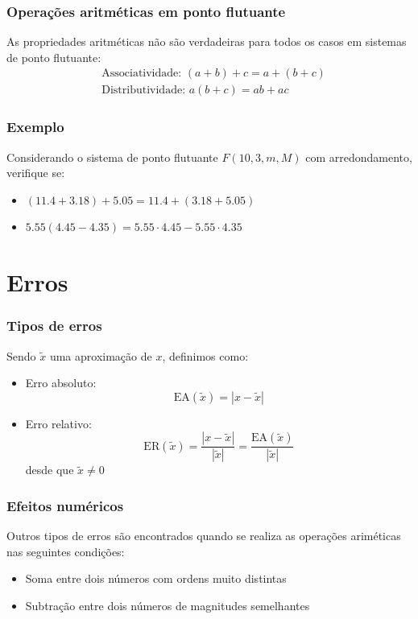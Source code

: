 \documentclass{beamer}
\begin{document}
\begin{frame}
	\frametitle{Operações aritméticas em ponto flutuante}
	As propriedades aritméticas não são verdadeiras para todos os casos em sistemas de ponto flutuante:
	\begin{equation*}
		\begin{aligned}
			&\mbox{Associatividade: } (a + b) + c = a + (b + c)\\
			&\mbox{Distributividade: } a (b + c) = ab + ac		
		\end{aligned}
	\end{equation*}
\end{frame}

\begin{frame}
	\frametitle{Exemplo}
	Considerando o sistema de ponto flutuante $ F(10, 3, m, M) $ com arredondamento, verifique se:
	\begin{itemize}
		\item $ (11.4 + 3.18) + 5.05 = 11.4 + (3.18 + 5.05) $
		\item $ 5.55(4.45 - 4.35) = 5.55\cdot 4.45 - 5.55\cdot4.35$
	\end{itemize}
\end{frame}

\section{Erros}

\begin{frame}
	\frametitle{Tipos de erros}
	Sendo $ \tilde{x} $ uma aproximação de $ x $, definimos como:
	\begin{itemize}
		\item Erro absoluto:
		\begin{equation*}
			\mbox{EA}(\tilde{x}) = |x - \tilde{x}|
		\end{equation*}
		\item Erro relativo:
		\begin{equation*}
			\mbox{ER}(\tilde{x}) = \frac{|x - \tilde{x}|}{|\tilde{x}|} = \frac{\mbox{EA}(\tilde{x})}{|\tilde{x}|}
		\end{equation*}
		desde que $ \tilde{x} \neq 0 $
	\end{itemize}
\end{frame}

\begin{frame}
	\frametitle{Efeitos numéricos}
	Outros tipos de erros são encontrados quando se realiza as operações ariméticas nas seguintes condições:
	\begin{itemize}
	\item Soma entre dois números com ordens muito distintas
	\item Subtração entre dois números de magnitudes semelhantes
	\end{itemize}
\end{frame}
\end{document}
